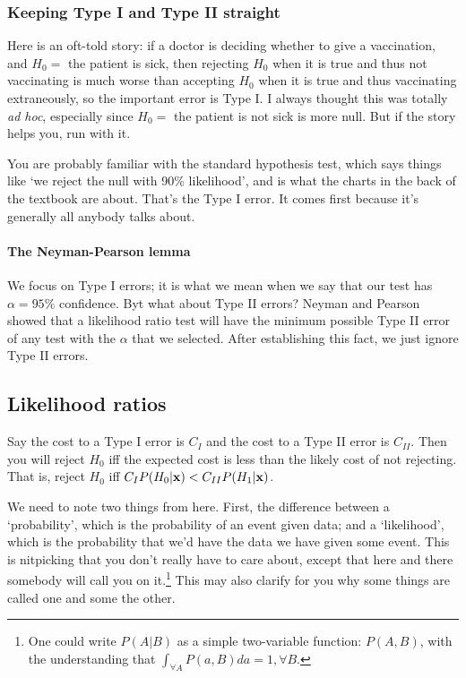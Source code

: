\subsubsection{Keeping Type I and Type II straight} 
 
Here is an oft-told story: if a doctor is deciding
whether to give a vaccination, and $H_0=$ the patient is sick, then
rejecting $H_0$ when it is true and thus not vaccinating is much worse
than accepting $H_0$ when it is true and thus vaccinating extraneously,
so the important error is Type I. I always thought this was totally
{\it ad hoc}, especially since $H_0=$ the patient is not sick is more
null. But if the story helps you, run with it.

You are probably familiar with the
standard hypothesis test, which says things like `we reject the null with 90\%
likelihood', and is what the charts in the back of the textbook are about.
That's the Type I error. It comes first because
it's generally all anybody talks about.

\paragraph{The Neyman-Pearson lemma}  
We focus on Type I errors; it is what we mean when we say that our
test has $\alpha=95\%$ confidence. Byt what about Type II errors? 
Neyman and Pearson showed that a likelihood ratio test will have the
minimum possible Type II error of any test with the $\alpha$ that we
selected. After establishing this fact, we just ignore Type II errors.

\subsection{Likelihood ratios} 

Say the cost to a Type I error is $C_I$ and the cost to a Type II error
is $C_{II}$.  Then you will reject $H_0$ iff the expected cost is less
than the likely cost of not rejecting. That is, reject $H_0$ iff $C_I
P(H_0|{\bf x})<C_{II} P(H_1|{\bf x})$.

We need to note two things from here. First, the difference between a
`probability', which is the probability of an event given data; and a
`likelihood', which is the probability that we'd have the data we have
given some event. This is nitpicking that you don't really have to care
about, except that here and there somebody will call you on
it.\footnote{One could write $P(A|B)$ as a simple two-variable function:
$P(A,B)$, with the understanding that $\int_{\forall A} P(a,B)da = 1,
\forall B$.} This may
also clarify for you why some things are called one and some the other.


